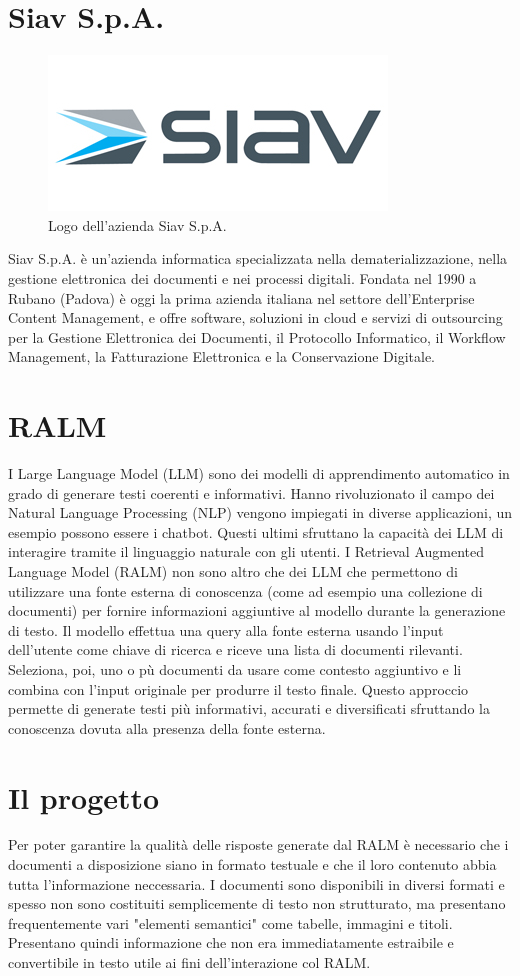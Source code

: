 \section{Siav S.p.A.}

\begin{figure}[!h] 
    \centering 
    \includegraphics[width=0.5\columnwidth]{images/logoSiav.jpg} 
    \caption{Logo dell'azienda Siav S.p.A.}
\end{figure}
Siav S.p.A. è un’azienda informatica specializzata nella dematerializzazione, nella gestione elettronica dei documenti e nei processi digitali.
Fondata nel 1990 a Rubano (Padova) è oggi la prima azienda italiana nel settore dell’Enterprise Content Management, e offre software, soluzioni in cloud e servizi di outsourcing per la Gestione Elettronica dei Documenti, il Protocollo Informatico, il Workflow Management, la Fatturazione Elettronica e la Conservazione Digitale.

\section{RALM}
I Large Language Model (LLM) sono dei modelli di apprendimento automatico in grado di generare testi coerenti e informativi.
Hanno rivoluzionato il campo dei Natural Language Processing (NLP) vengono impiegati in diverse applicazioni, un esempio possono essere i chatbot.
Questi ultimi sfruttano la capacità dei LLM di interagire tramite il linguaggio naturale con gli utenti.
I Retrieval Augmented Language Model (RALM) non sono altro che dei LLM che permettono di utilizzare una fonte esterna di conoscenza (come ad esempio una collezione di documenti)
per fornire informazioni aggiuntive al modello durante la generazione di testo.
Il modello effettua una query alla fonte esterna usando l'input dell'utente come chiave di ricerca e riceve una lista di documenti rilevanti.
Seleziona, poi, uno o pù documenti da usare come contesto aggiuntivo e li combina con l'input originale per produrre il testo finale.
Questo approccio permette di generate testi più informativi, accurati e diversificati sfruttando la conoscenza dovuta alla presenza della fonte esterna.

\section{Il progetto}
Per poter garantire la qualità delle risposte generate dal RALM è necessario che i documenti a disposizione siano in formato testuale e che il loro contenuto abbia tutta l'informazione 
neccessaria.
I documenti sono disponibili in diversi formati e spesso non sono costituiti semplicemente di testo non strutturato, ma presentano frequentemente vari
"elementi semantici" come tabelle, immagini e titoli.
Presentano quindi informazione che non era immediatamente estraibile e convertibile in testo utile ai fini dell'interazione col RALM.

